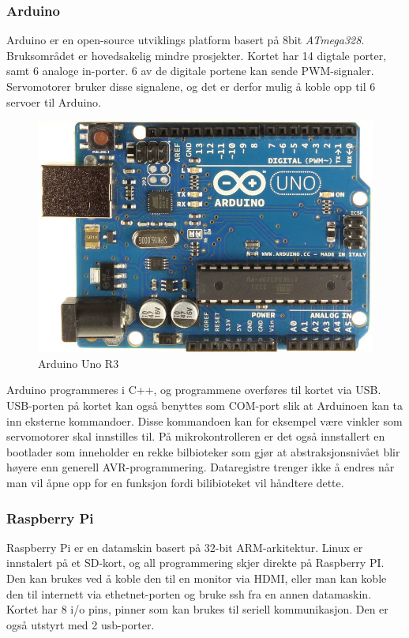 \subsubsection{Arduino}
Arduino er en open-source utviklings platform basert på 8bit \textit{ATmega328}. Bruksområdet er hovedsakelig mindre prosjekter. Kortet har 14 digtale porter, samt 6 analoge in-porter. 6 av de digitale portene kan sende PWM-signaler. Servomotorer bruker disse signalene, og det er derfor mulig å koble opp til 6 servoer til Arduino. 
\begin{figure}[h!]
\centering
\includegraphics[scale = 0.25]{img/arduinoBoard.jpg}
\caption{Arduino Uno R3}
\end{figure}
Arduino programmeres i C++, og programmene overføres til kortet via USB. USB-porten på kortet kan også benyttes som COM-port slik at Arduinoen kan ta inn eksterne kommandoer. Disse kommandoen kan for eksempel være vinkler som servomotorer skal innstilles til. På mikrokontrolleren er det også innstallert en bootlader som inneholder en rekke bilbioteker som gjør at abstraksjonsnivået blir høyere enn generell AVR-programmering. Dataregistre trenger ikke å endres når man vil åpne opp for en funksjon fordi bilibioteket vil håndtere dette. 

\subsubsection{Raspberry Pi}
Raspberry Pi er en datamskin basert på 32-bit ARM-arkitektur. Linux er innstalert på et SD-kort, og all programmering skjer direkte på Raspberry PI. Den kan brukes ved å koble den til en monitor via HDMI, eller man kan koble den til internett via ethetnet-porten og bruke ssh fra en annen datamaskin. Kortet har 8 i/o pins, pinner som kan brukes til seriell kommunikasjon. Den er også utstyrt med 2 usb-porter.


